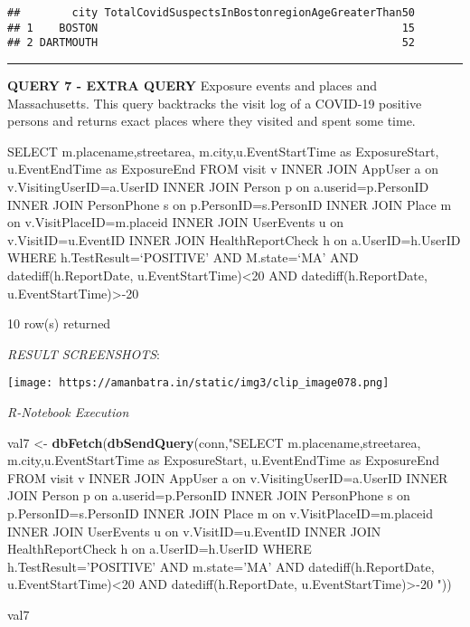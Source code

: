 \documentclass[
]{article}
\newenvironment{Shaded}{\begin{snugshade}}{\end{snugshade}}
\newcommand{\KeywordTok}[1]{\textcolor[rgb]{0.13,0.29,0.53}{\textbf{#1}}}
\newcommand{\NormalTok}[1]{#1}
\newcommand{\StringTok}[1]{\textcolor[rgb]{0.31,0.60,0.02}{#1}}
\begin{document}
\begin{verbatim}
##        city TotalCovidSuspectsInBostonregionAgeGreaterThan50
## 1    BOSTON                                               15
## 2 DARTMOUTH                                               52
\end{verbatim}

\begin{center}\rule{0.5\linewidth}{0.5pt}\end{center}

\textbf{QUERY 7 - EXTRA QUERY} Exposure events and places and
Massachusetts. This query backtracks the visit log of a COVID-19
positive persons and returns exact places where they visited and spent
some time.

SELECT m.placename,streetarea, m.city,u.EventStartTime as ExposureStart,
u.EventEndTime as ExposureEnd FROM visit v INNER JOIN AppUser a on
v.VisitingUserID=a.UserID INNER JOIN Person p on a.userid=p.PersonID
INNER JOIN PersonPhone s on p.PersonID=s.PersonID INNER JOIN Place m on
v.VisitPlaceID=m.placeid INNER JOIN UserEvents u on v.VisitID=u.EventID
INNER JOIN HealthReportCheck h on a.UserID=h.UserID WHERE
h.TestResult=`POSITIVE' AND M.state=`MA' AND datediff(h.ReportDate,
u.EventStartTime)\textless20 AND datediff(h.ReportDate,
u.EventStartTime)\textgreater-20

10 row(s) returned

\emph{RESULT SCREENSHOTS}:

\texttt{[image: https://amanbatra.in/static/img3/clip\_image078.png]}

\emph{R-Notebook Execution}

\begin{Shaded}
\begin{Highlighting}[]
\NormalTok{val7 <-}\StringTok{ }\KeywordTok{dbFetch}\NormalTok{(}\KeywordTok{dbSendQuery}\NormalTok{(conn,}\StringTok{"SELECT m.placename,streetarea, m.city,u.EventStartTime as ExposureStart, u.EventEndTime as ExposureEnd FROM visit v}
\StringTok{INNER JOIN AppUser a on v.VisitingUserID=a.UserID}
\StringTok{INNER JOIN Person p on a.userid=p.PersonID}
\StringTok{INNER JOIN PersonPhone s on p.PersonID=s.PersonID}
\StringTok{INNER JOIN Place m on v.VisitPlaceID=m.placeid}
\StringTok{INNER JOIN UserEvents u on v.VisitID=u.EventID}
\StringTok{INNER JOIN HealthReportCheck h on a.UserID=h.UserID}
\StringTok{WHERE h.TestResult='POSITIVE'}
\StringTok{AND m.state='MA'}
\StringTok{AND datediff(h.ReportDate, u.EventStartTime)<20 }
\StringTok{AND datediff(h.ReportDate, u.EventStartTime)>-20}
\StringTok{"}\NormalTok{))}

\NormalTok{val7}
\end{Highlighting}
\end{Shaded}
\end{document}
